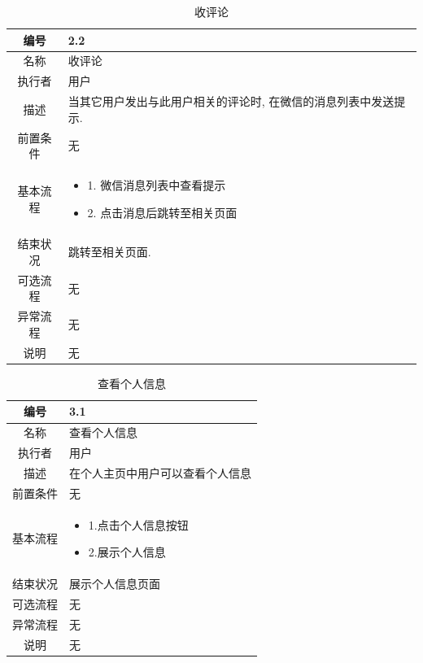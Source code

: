 \begin{table}[htbp]
	\centering
	\begin{tabular}{|c|p{11cm}|}
        \hline
        编号 & 2.2 \\ 
        \hline
        名称 & 收评论 \\ 
        \hline
        执行者 &用户 \\
        \hline
        描述 & 当其它用户发出与此用户相关的评论时, 在微信的消息列表中发送提示.        \\
        \hline
        前置条件 & 无 \\
        \hline
        基本流程 & \begin{itemize}
            \item 1. 微信消息列表中查看提示
            \item 2. 点击消息后跳转至相关页面
        \end{itemize} \\
        \hline
        结束状况 & 跳转至相关页面. \\
        \hline
        可选流程 & 无 \\
        \hline
        异常流程 & 无 \\
        \hline
        说明 & 无 \\
        \hline
    \end{tabular}
    \caption{收评论}
\end{table}

\begin{table}[htbp]
	\centering
	\begin{tabular}{|c|p{11cm}|}
        \hline
        编号 & 3.1 \\
        \hline
        名称 & 查看个人信息 \\ 
        \hline
        执行者 &用户 \\
        \hline
        描述 & 在个人主页中用户可以查看个人信息       \\
        \hline
        前置条件 & 无 \\
        \hline
        基本流程 & \begin{itemize}
            \item 1.点击个人信息按钮
            \item 2.展示个人信息
        \end{itemize} \\
        \hline
        结束状况 & 展示个人信息页面 \\
        \hline
        可选流程 & 无 \\
        \hline
        异常流程 & 无 \\
        \hline
        说明 & 无 \\
        \hline
    \end{tabular}
    \caption{查看个人信息}
\end{table}

